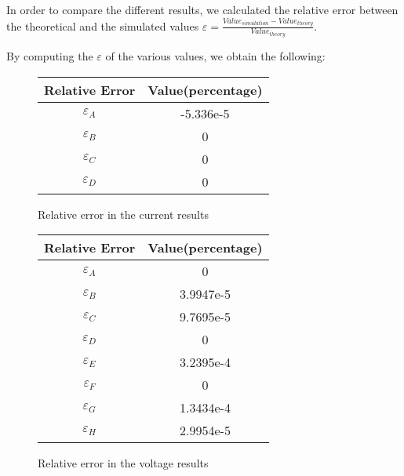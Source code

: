 \label{comparison}
In order to compare the different results, we calculated the relative error between the theoretical and the simulated values $\varepsilon = \frac{Value_{simulation} - Value_{theory}}{Value_{theory}}$.

By computing the $\varepsilon$ of the various values, we obtain the following:

\begin{figure}[h]
	\centering
	\begin{tabular}{|c|c|}
		\hline
		Relative Error    &  Value(percentage) \\
		\hline
		$\varepsilon_A$   &  -5.336e-5 \\
		\hline
		$\varepsilon_B$   &      0     \\
		\hline
		$\varepsilon_C$   &      0     \\
		\hline
		$\varepsilon_D$   &      0     \\
		\hline		
	\end{tabular}
	\caption{Relative error in the current results}
	\label{current_error}
\end{figure}

\vspace{30pt}

\begin{figure}[h]
	\centering
	\begin{tabular}{|c|c|}
		\hline
		Relative Error & Value(percentage)  \\
		\hline
		$\varepsilon_A$   &     0      \\
		\hline
		$\varepsilon_B$   &  3.9947e-5 \\
		\hline
		$\varepsilon_C$   &  9.7695e-5 \\
		\hline
		$\varepsilon_D$   &     0      \\
		\hline
		$\varepsilon_E$   &  3.2395e-4 \\
		\hline
		$\varepsilon_F$   &     0      \\
		\hline
		$\varepsilon_G$   &  1.3434e-4 \\
		\hline
		$\varepsilon_H$   &  2.9954e-5 \\
		\hline
	\end{tabular}
	\caption{Relative error in the voltage results}
	\label{voltage_error}
\end{figure}
